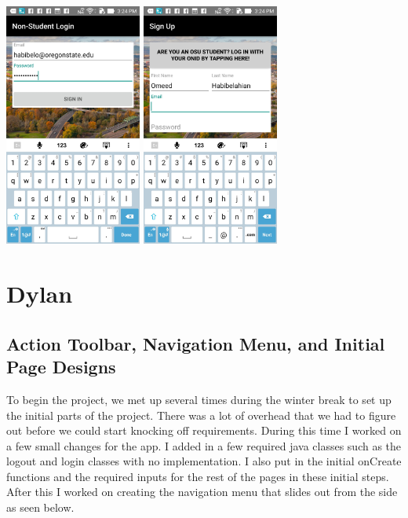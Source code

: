 \documentclass[onecolumn, draftclsnofoot,10pt, compsoc]{IEEEtran}
\begin{document}
		\includegraphics[height=8cm]{nonstudentlogin}
		\includegraphics[height=8cm]{signup}

\newpage
\section{Dylan}
	\subsection{Action Toolbar, Navigation Menu, and Initial Page Designs}
		To begin the project, we met up several times during the winter break to set up the initial parts of the project. There was a lot of overhead that we had to figure out before we could start knocking off requirements. During this time I worked on a few small changes for the app. I added in a few required java classes such as the logout and login classes with no implementation. I also put in the initial onCreate functions and the required inputs for the rest of the pages in these initial steps. After this I worked on creating the navigation menu that slides out from the side as seen below. \\ \\
\end{document}
